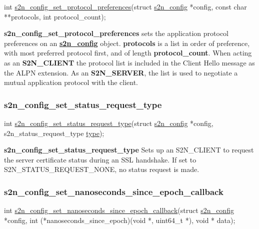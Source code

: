 \begin{DoxyCode}
\textcolor{keywordtype}{int} \hyperlink{s2n_8h_a9f5f2fca97444f9c039a3681c2351fb0}{s2n\_config\_set\_protocol\_preferences}(\textcolor{keyword}{struct} 
      \hyperlink{structs2n__config}{s2n\_config} *config,
                                        \textcolor{keyword}{const} \textcolor{keywordtype}{char} **protocols,
                                        \textcolor{keywordtype}{int} protocol\_count);
\end{DoxyCode}


{\bfseries s2n\+\_\+config\+\_\+set\+\_\+protocol\+\_\+preferences} sets the application protocol preferences on an {\bfseries \hyperlink{structs2n__config}{s2n\+\_\+config}} object. {\bfseries protocols} is a list in order of preference, with most preferred protocol first, and of length {\bfseries protocol\+\_\+count}. When acting as an {\bfseries S2\+N\+\_\+\+C\+L\+I\+E\+NT} the protocol list is included in the Client Hello message as the A\+L\+PN extension. As an {\bfseries S2\+N\+\_\+\+S\+E\+R\+V\+ER}, the list is used to negotiate a mutual application protocol with the client.

\subsubsection*{s2n\+\_\+config\+\_\+set\+\_\+status\+\_\+request\+\_\+type}


\begin{DoxyCode}
\textcolor{keywordtype}{int} \hyperlink{s2n_8h_ae98f2b06b3311e7e845e938392d3505d}{s2n\_config\_set\_status\_request\_type}(\textcolor{keyword}{struct} 
      \hyperlink{structs2n__config}{s2n\_config} *config, s2n\_status\_request\_type \hyperlink{crypto_2x509_2x509_8h_ab512b8f495325c7ea0f5a5a5d3f938eb}{type});
\end{DoxyCode}


{\bfseries s2n\+\_\+config\+\_\+set\+\_\+status\+\_\+request\+\_\+type} Sets up an S2\+N\+\_\+\+C\+L\+I\+E\+NT to request the server certificate status during an S\+SL handshake. If set to S2\+N\+\_\+\+S\+T\+A\+T\+U\+S\+\_\+\+R\+E\+Q\+U\+E\+S\+T\+\_\+\+N\+O\+NE, no status request is made.

\subsubsection*{s2n\+\_\+config\+\_\+set\+\_\+nanoseconds\+\_\+since\+\_\+epoch\+\_\+callback}


\begin{DoxyCode}
\textcolor{keywordtype}{int} \hyperlink{s2n_8h_a55f4687b7def930a7ac41335d35d72ef}{s2n\_config\_set\_nanoseconds\_since\_epoch\_callback}(\textcolor{keyword}{struct} 
      \hyperlink{structs2n__config}{s2n\_config} *config, \textcolor{keywordtype}{int} (*nanoseconds\_since\_epoch)(\textcolor{keywordtype}{void} *, uint64\_t *), \textcolor{keywordtype}{void} * data);
\end{DoxyCode}


